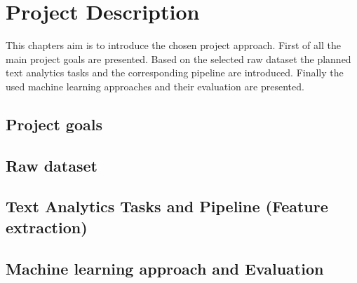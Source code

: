 \section{Project Description}

This chapters aim is to introduce the chosen project approach. First of all the main project goals are presented. Based on the selected raw dataset the planned text analytics tasks and the corresponding pipeline are introduced. Finally the used machine learning approaches and their evaluation are presented.

\subsection{Project goals}

\subsection{Raw dataset}

\subsection{Text Analytics Tasks and Pipeline (Feature extraction)}

\subsection{Machine learning approach and Evaluation}